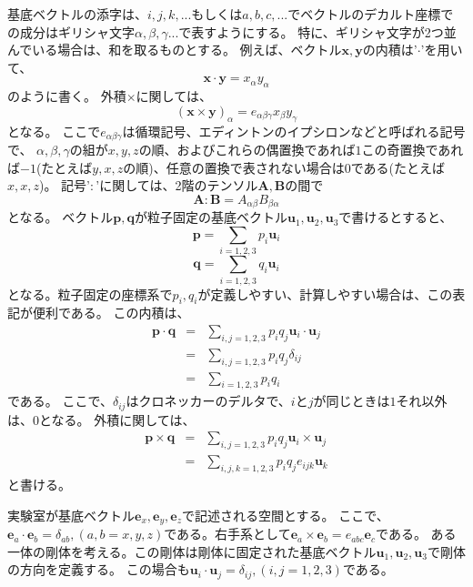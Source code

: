 \documentclass[a4paper,11pt]{jbook}
\begin{document}
基底ベクトルの添字は、$i,j,k,...$もしくは$a,b,c,...$でベクトルのデカルト座標での成分はギリシャ文字$\alpha, \beta,\gamma ...$で表すようにする。
特に、ギリシャ文字が2つ並んでいる場合は、和を取るものとする。
例えば、ベクトル$\bm{x},\bm{y}$の内積は'$\cdot$'を用いて、
\begin{equation}
\bm{x}\cdot\bm{y}=x_\alpha y_\alpha
\end{equation}
のように書く。
外積$\times$に関しては、
\begin{equation}
(\bm{x}\times\bm{y})_\alpha=e_{\alpha\beta\gamma}x_{\beta}y_{\gamma}
\end{equation}
となる。
ここで$e_{\alpha\beta\gamma}$は循環記号、エディントンのイプシロンなどと呼ばれる記号で、
$\alpha,\beta,\gamma$の組が$x,y,z$の順、およびこれらの偶置換であれば$1$この奇置換であれば$-1$(たとえば$y,x,z$の順)、任意の置換で表されない場合は$0$である(たとえば$x,x,z$)。
記号'$:$'に関しては、2階のテンソル$\bm{A},\bm{B}$の間で
\begin{equation}
\bm{A}:\bm{B}=A_{\alpha\beta}B_{\beta\alpha}
\end{equation}
となる。
ベクトル$\bm{p},\bm{q}$が粒子固定の基底ベクトル$\bm{u}_1,\bm{u}_2,\bm{u}_3$で書けるとすると、
\begin{equation}
\bm{p}=\sum_{i=1,2,3}p_i\bm{u}_i
\end{equation}
\begin{equation}
\bm{q}=\sum_{i=1,2,3}q_i\bm{u}_i
\end{equation}
となる。粒子固定の座標系で$p_i, q_i$が定義しやすい、計算しやすい場合は、この表記が便利である。
この内積は、
\begin{eqnarray}
\bm{p}\cdot\bm{q}&=&\sum_{i,j=1,2,3}p_iq_j\bm{u}_i\cdot\bm{u}_j\nonumber\\
&=&\sum_{i,j=1,2,3}p_iq_j\delta_{ij}\nonumber\\
&=&\sum_{i=1,2,3}p_iq_i
\end{eqnarray}
である。
ここで、$\delta_{ij}$はクロネッカーのデルタで、$i$と$j$が同じときは$1$それ以外は、$0$となる。
外積に関しては、
\begin{eqnarray}
\bm{p}\times\bm{q}&=&\sum_{i,j=1,2,3}p_iq_j\bm{u}_i\times\bm{u}_j\nonumber\\
&=&\sum_{i,j,k=1,2,3}p_iq_j e_{ijk}\bm{u}_k
\end{eqnarray}
と書ける。

実験室が基底ベクトル$\bm{e}_x, \bm{e}_y,\bm{e}_z $で記述される空間とする。
ここで、$\bm{e}_a\cdot\bm{e}_b=\delta_{ab}, (a,b=x,y,z)$である。右手系として$\bm{e}_a\times\bm{e}_b=e_{abc}\bm{e}_c$である。
ある一体の剛体を考える。この剛体は剛体に固定された基底ベクトル$\bm{u}_1,\bm{u}_2,\bm{u}_3$で剛体の方向を定義する。
この場合も$\bm{u}_i\cdot\bm{u}_j=\delta_{ij}, (i,j=1,2,3)$である。
\end{document}
